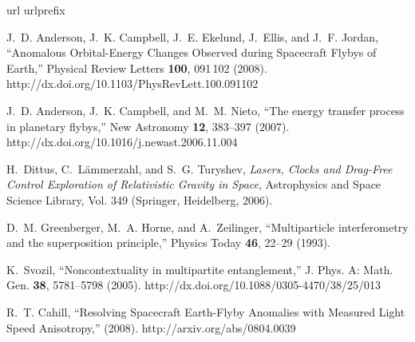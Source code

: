 \documentclass[prl,preprint,amsfonts,showpacs,showkeys]{revtex4}
\begin{document}
\begin{thebibliography}{1}
\newcommand{\enquote}[1]{``#1''}
\expandafter\ifx\csname url\endcsname\relax
  \def\url#1{{#1}}\fi
\expandafter\ifx\csname urlprefix\endcsname\relax\def\urlprefix{}\fi

J.~D. Anderson, J.~K. Campbell, J.~E. Ekelund, J.~Ellis, and J.~F. Jordan,
  \enquote{Anomalous Orbital-Energy Changes Observed during Spacecraft Flybys
  of Earth,} Physical Review Letters {\bf 100}, 091\,102 (2008).
\newline http://dx.doi.org/10.1103/PhysRevLett.100.091102

J.~D. Anderson, J.~K. Campbell, and M.~M. Nieto, \enquote{The energy transfer
  process in planetary flybys,} New Astronomy {\bf 12}, 383--397 (2007).
\newline http://dx.doi.org/10.1016/j.newast.2006.11.004

H.~Dittus, C.~L{\"{a}}mmerzahl, and S.~G. Turyshev, {\em Lasers, Clocks and
  Drag-Free Control Exploration of Relativistic Gravity in Space\/},
  Astrophysics and Space Science Library, Vol. 349 (Springer, Heidelberg,
  2006).

D.~M. Greenberger, M.~A. Horne, and A.~Zeilinger, \enquote{Multiparticle
  interferometry and the superposition principle,} Physics Today {\bf 46},
  22--29 (1993).

K.~Svozil, \enquote{Noncontextuality in multipartite entanglement,} J. Phys. A:
  Math. Gen. {\bf 38}, 5781--5798 (2005).
\newline http://dx.doi.org/10.1088/0305-4470/38/25/013

R.~T. Cahill, \enquote{Resolving Spacecraft Earth-Flyby Anomalies with Measured
  Light Speed Anisotropy,}  (2008).
\newline http://arxiv.org/abs/0804.0039

\end{thebibliography}
\end{document}
